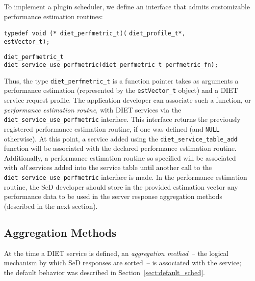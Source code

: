 To implement a plugin scheduler, we define an
interface that admits customizable performance estimation routines:
\begin{tabbing}
  \texttt{typedef void (* diet\_perfmetric\_t)(}
    \=\texttt{diet\_profile\_t*,} \\
    \>\texttt{estVector\_t);} \\
\end{tabbing}
\begin{tabbing}
  \texttt{diet\_perfmetric\_t} \\
  \texttt{diet\_service\_use\_perfmetric(diet\_perfmetric\_t perfmetric\_fn);}\\
\end{tabbing}
Thus, the type \texttt{diet\_perfmetric\_t} is a function pointer
takes as arguments a performance estimation (represented by the
\texttt{estVector\_t} object) and a DIET service request
profile.  The application
developer can associate such a function, or
\emph{performance estimation routne}, with DIET services via the
\texttt{diet\_service\_use\_perfmetric} interface.  This interface
returns the previously registered performance estimation routine, if
one was defined (and
\texttt{NULL} otherwise).  At this point, a service added using the
\texttt{diet\_service\_table\_add} function will be associated with
the declared performance estimation routine.
Additionally, a performance estimation routine so specified will be
associated with \emph{all} services added into the service table until
another call to the
\texttt{diet\_service\_use\_perfmetric} interface is made.
In the performance estimation routine, the SeD developer should store
in the provided estimation vector
any performance data to be used in the server response aggregation
methods (described in the next section).

\subsection{Aggregation Methods}\label{sect:agg_methods}

At the time a DIET service is defined, an \emph{aggregation method}~--
the logical mechanism by which SeD responses are sorted~-- is
associated with the service; the default behavior was described in
Section~\ref{sect:default_sched}.

